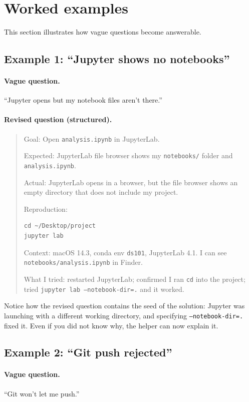 \section{Worked examples}
This section illustrates how vague questions become answerable.

\subsection{Example 1: ``Jupyter shows no notebooks''}
\paragraph{Vague question.} ``Jupyter opens but my notebook files aren't there.''

\paragraph{Revised question (structured).}
\begin{quote}
Goal: Open \texttt{analysis.ipynb} in JupyterLab.

Expected: JupyterLab file browser shows my \texttt{notebooks/} folder and \texttt{analysis.ipynb}.

Actual: JupyterLab opens in a browser, but the file browser shows an empty directory that does not include my project.

Reproduction:
\begin{verbatim}
cd ~/Desktop/project
jupyter lab
\end{verbatim}

Context: macOS 14.3, conda env \texttt{ds101}, JupyterLab 4.1. I can see \texttt{notebooks/analysis.ipynb} in Finder.

What I tried: restarted JupyterLab; confirmed I ran \texttt{cd} into the project; tried \texttt{jupyter lab --notebook-dir=.} and it worked.
\end{quote}

Notice how the revised question contains the seed of the solution: Jupyter was launching with a different working directory, and specifying \texttt{--notebook-dir=.} fixed it. Even if you did not know why, the helper can now explain it.

\subsection{Example 2: ``Git push rejected''}
\paragraph{Vague question.} ``Git won't let me push.''

